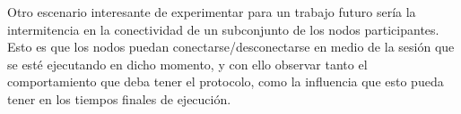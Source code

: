Otro escenario interesante de experimentar para un trabajo futuro sería 
la intermitencia en la conectividad de un subconjunto de los nodos participantes. 
Esto es que los nodos puedan conectarse/desconectarse en medio de la sesión 
que se esté ejecutando en dicho momento, y con ello observar tanto 
el comportamiento que deba tener el protocolo, como la influencia que 
esto pueda tener en los tiempos finales de ejecución. 
